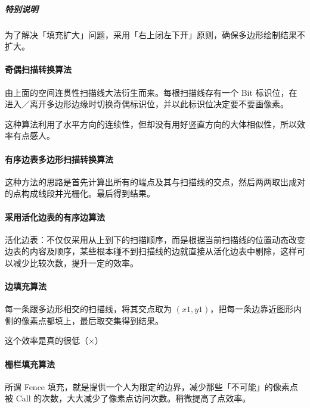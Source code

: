 \documentclass[
]{article}
\begin{document}
\hypertarget{header-n24}{%
\subparagraph{特别说明}\label{header-n24}}

为了解决「填充扩大」问题，采用「右上闭左下开」原则，确保多边形绘制结果不扩大。

\hypertarget{header-n26}{%
\paragraph{奇偶扫描转换算法}\label{header-n26}}

由上面的空间连贯性扫描线大法衍生而来。每根扫描线存有一个 Bit
标识位，在进入／离开多边形边缘时切换奇偶标识位，并以此标识位决定要不要画像素。

这种算法利用了水平方向的连续性，但却没有用好竖直方向的大体相似性，所以效率有点感人。

\hypertarget{header-n29}{%
\paragraph{有序边表多边形扫描转换算法}\label{header-n29}}

这种方法的思路是首先计算出所有的端点及其与扫描线的交点，然后两两取出成对的点构成线段并光栅化。最后得到结果。

\hypertarget{header-n31}{%
\paragraph{采用活化边表的有序边算法}\label{header-n31}}

活化边表：不仅仅采用从上到下的扫描顺序，而是根据当前扫描线的位置动态改变边表的内容及顺序，某些根本碰不到扫描线的边就直接从活化边表中剔除，这样可以减少比较次数，提升一定的效率。

\hypertarget{header-n33}{%
\paragraph{边填充算法}\label{header-n33}}

每一条跟多边形相交的扫描线，将其交点取为
\((x1, y1)\)，把每一条边靠近图形内侧的像素点都填上，最后取交集得到结果。

这个效率是真的很低（×）

\hypertarget{header-n36}{%
\paragraph{栅栏填充算法}\label{header-n36}}

所谓 Fence
填充，就是提供一个人为限定的边界，减少那些「不可能」的像素点被 Call
的次数，大大减少了像素点访问次数。稍微提高了点效率。
\end{document}
